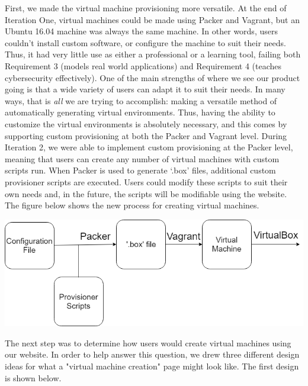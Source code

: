 \documentclass[openright]{report}
\begin{document}
\par First, we made the virtual machine provisioning more versatile. At the end of Iteration One, virtual machines could be made using Packer and Vagrant, but an Ubuntu 16.04 machine was always the same machine. In other words, users couldn't install custom software, or configure the machine to suit their needs. Thus, it had very little use as either a professional or a learning tool, failing both Requirement 3 (models real world applications) and Requirement 4 (teaches cybersecurity effectively). One of the main strengths of where we see our product going is that a wide variety of users can adapt it to suit their needs. In many ways, that is \textit{all} we are trying to accomplish: making a versatile method of automatically generating virtual environments. Thus, having the ability to customize the virtual environments is absolutely necessary, and this comes by supporting custom provisioning at both the Packer and Vagrant level. During Iteration 2, we were able to implement custom provisioning at the Packer level, meaning that users can create any number of virtual machines with custom scripts run. When Packer is used to generate `.box' files, additional custom provisioner scripts are executed. Users could modify these scripts to suit their own needs and, in the future, the scripts will be modifiable using the website. The figure below shows the new process for creating virtual machines.

\begin{center}
    \includegraphics[scale=0.64]{images/Proto2.png}
    \label{scriptFlow}
\end{center}

\par The next step was to determine how users would create virtual machines using our website. In order to help answer this question, we drew three different design ideas for what a "virtual machine creation" page might look like. The first design is shown below.
\end{document}
